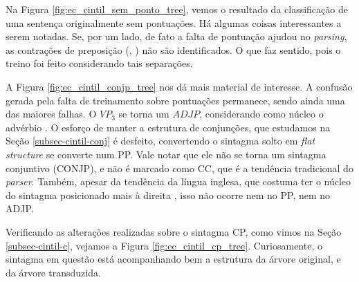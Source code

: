 Na Figura \ref{fig:ec_cintil_sem_ponto_tree}, vemos o resultado da classificação de uma sentença originalmente sem pontuações. Há algumas coisas interessantes a serem notadas. Se, por um lado, de fato a falta de pontuação ajudou no \textit{parsing}, 
as contrações de preposição (, ) não são identificados. O que faz sentido, pois o treino foi feito considerando tais separações.

\begin{center}
    
\end{center}

A Figura \ref{fig:ec_cintil_conjp_tree} nos dá mais material de interesse. 
A confusão gerada pela falta de treinamento sobre pontuações permanece, sendo ainda uma das maiores falhas. O $VP_3$  se torna um $ADJP$, considerando como núcleo o advérbio . O esforço de manter a estrutura de conjunções, que estudamos na Seção \ref{subsec-cintil-conj} é desfeito, convertendo o sintagma solto em \textit{flat structure}  se converte num PP. Vale notar que ele não se torna um sintagma conjuntivo (CONJP), e  não é marcado como CC, que é a tendência tradicional do \textit{parser}. Também, apesar da tendência da língua inglesa, que costuma ter o núcleo do sintagma posicionado mais à direita \cite[p~40]{charniak97statistical}, isso não ocorre nem no PP, nem no ADJP.

\begin{center}
    
\end{center}

Verificando as alterações realizadas sobre o sintagma CP, como vimos na Seção \ref{subsec-cintil-c}, vejamos a Figura \ref{fig:ec_cintil_cp_tree}. Curiosamente, o sintagma em questão está acompanhando bem a estrutura da árvore original, e da árvore transduzida. 
\begin{center}
    
\end{center}

